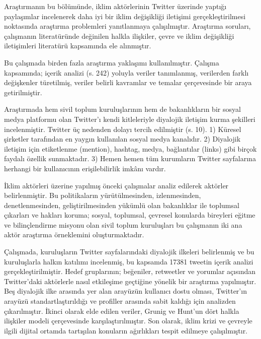 \documentclass[
]{book}
\begin{document}
Araştırmanın bu bölümünde, iklim aktörlerinin Twitter üzerinde yaptığı paylaşımlar incelenerek daha iyi bir iklim değişikliği iletişimi gerçekleştirilmesi noktasında araştırma problemleri yanıtlanmaya çalışılmıştır. Araştırma soruları, çalışmanın literatüründe değinilen halkla ilişkiler, çevre ve iklim değişikliği iletişimleri literatürü kapsamında ele alınmıştır.

Bu çalışmada birden fazla araştırma yaklaşımı kullanılmıştır. Çalışma kapsamında; içerik analizi (s. 242) \citep{yildirim2018sosyal} yoluyla veriler tanımlanmış, verilerden farklı değişkenler türetilmiş, veriler belirli kavramlar ve temalar çerçevesinde bir araya getirilmiştir.

Araştırmada hem sivil toplum kuruluşlarının hem de bakanlıkların bir sosyal medya platformu olan Twitter'ı kendi kitleleriyle diyalojik iletişim kurma şekilleri incelenmiştir. Twitter üç nedenden dolayı tercih edilmiştir (s. 10). \citep{wang2020dialogic} 1) Küresel şirketler tarafından en yaygın kullanılan sosyal medya kanalıdır. 2) Diyalojik iletişim için etiketlenme (mention), hashtag, medya, bağlantılar (links) gibi birçok faydalı özellik sunmaktadır. 3) Hemen hemen tüm kurumların Twitter sayfalarına herhangi bir kullanıcının erişilebilirlik imkânı vardır.

İklim aktörleri üzerine yapılmış önceki çalışmalar analiz edilerek aktörler belirlenmiştir. \citep{ozer2017iklim, ozmen2011cevre, sahin2019turkiye} Bu politikaların yürütülmesinden, izlenmesinden, denetlenmesinden, geliştirilmesinden yükümlü olan bakanlıklar \citep{yagmurlu2019dijital} ile toplumsal çıkarları ve hakları koruma; sosyal, toplumsal, çevresel konularda bireyleri eğitme ve bilinçlendirme misyonu olan sivil toplum kuruluşları bu çalışmanın iki ana aktör araştırma örneklemini oluşturmaktadır.

Çalışmada, kuruluşların Twitter sayfalarındaki diyalojik ilkeleri belirlenmiş ve bu kuruluşlarla halkın katılımı incelenmiş, bu kapsamda 17381 tweetin içerik analizi gerçekleştirilmiştir. Hedef gruplarının; beğeniler, retweetler ve yorumlar açısından Twitter'daki aktörlerle nasıl etkileşime geçtiğine yönelik bir araştırma yapılmıştır. Beş diyalojik ilke arasında yer alan arayüzün kullanıcı dostu olması, Twitter'ın arayüzü standartlaştırıldığı ve profiller arasında sabit kaldığı için analizden çıkarılmıştır. \citep{rybalko2010dialogic} İkinci olarak elde edilen veriler, Grunig ve Hunt'un dört halkla ilişkiler modeli çerçevesinde karşılaştırılmıştır. Son olarak, iklim krizi ve çevreyle ilgili dijital ortamda tartışılan konuların ağırlıkları tespit edilmeye çalışılmıştır.
\end{document}
